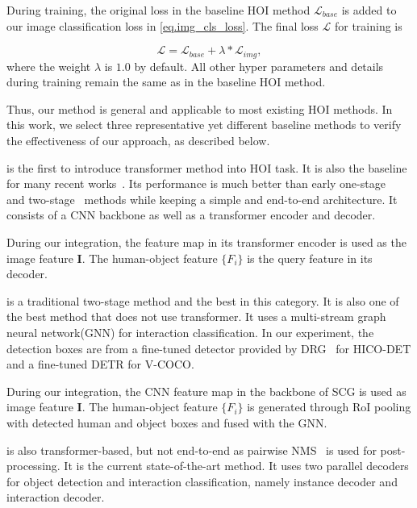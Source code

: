 \documentclass[10pt,twocolumn,letterpaper]{article}
\begin{document}
During training, the original loss in the baseline HOI method $\mathcal{L}_{base}$ is added to our image classification loss in \cref{eq.img_cls_loss}. The final loss $\mathcal{L}$ for training is

\begin{equation}
  \mathcal{L} = \mathcal{L}_{base} + \lambda * \mathcal{L}_{img},
  \label{eq.image_loss}
\end{equation}
where the weight $\lambda$ is $1.0$ by default. All other hyper parameters and details during training remain the same as in the baseline HOI method.

Thus, our method is general and applicable to most existing HOI methods. In this work, we select three representative yet different baseline methods to verify the effectiveness of our approach, as described below.

 is the first to introduce transformer method into HOI task. It is also the baseline for many recent works~\cite{zhang2021mining, zhou2022disentangled, park2022consistency, iftekhar2022ssrt, zhong2022hardquerymining}. Its performance is much better than early one-stage~\cite{liao2020ppdm, kim2020uniondet, wang2020learning} and two-stage~\cite{gupta2019nofrills, gao2020drg, kim2020detecting} methods while keeping a simple and end-to-end architecture. It consists of a CNN backbone as well as a transformer encoder and decoder.

During our integration, the feature map in its transformer encoder is used as the image feature $\mathbf{I}$. The human-object feature $\{F_{i}\}$ is the query feature in its decoder.

 is a traditional two-stage method and the best in this category. It is also one of the best method that does not use transformer. It uses a multi-stream graph neural network(GNN) for interaction classification. In our experiment, the detection boxes are from a fine-tuned detector provided by DRG~\cite{gao2020drg} for HICO-DET and a fine-tuned DETR for V-COCO.

During our integration, the CNN feature map in the backbone of SCG is used as image feature $\mathbf{I}$. The human-object feature $\{F_{i}\}$ is generated through RoI pooling with detected human and object boxes and fused with the GNN.

 is also transformer-based, but not end-to-end as pairwise NMS~\cite{zhang2021mining} is used for post-processing.
It is the current state-of-the-art method. It uses two parallel decoders for object detection and interaction classification, namely instance decoder and interaction decoder.
\end{document}
